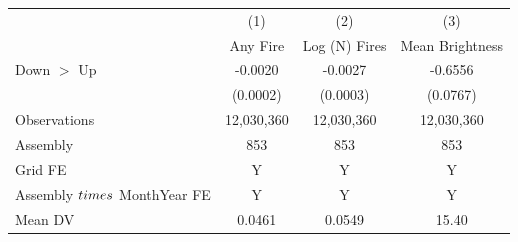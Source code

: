 \begin{tabular}{lccc}
\tabularnewline \hline
& (1) & (2) & (3)\\
& Any Fire & Log (N) Fires & Mean Brightness\\
\hline

Down $>$ Up &     -0.0020\sym{***}&     -0.0027\sym{***}&     -0.6556\sym{***}\\
            &    (0.0002)         &    (0.0003)         &    (0.0767)         \\
\hline
Observations&  12,030,360         &  12,030,360         &  12,030,360         \\
Assembly    &         853         &         853         &         853         \\
Grid FE     &           Y         &           Y         &           Y         \\
Assembly $\\times$ MonthYear FE&           Y         &           Y         &           Y         \\
Mean DV     &      0.0461         &      0.0549         &       15.40         \\
\hline
\end{tabular}
